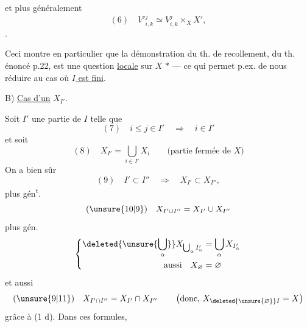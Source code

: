 et plus généralement
\[
(6)\quad V'{}^{j}_{i,k}\simeq V^{j}_{i,k}\times_X X',
\]
.

Ceci montre en particulier que la démonstration du th. de recollement, du th. énoncé p.22, est une question \uline{locale} sur $X$ \textcircled{$*$} --- ce qui permet p.ex. de nous réduire au cas où  \uline{$I$ est fini}.



B) \uline{Cas d'un} $X_{I'}$. 

Soit $I'$ une partie de $I$ telle que
\[
(7)\quad i\leq j\in I'\quad\Longrightarrow\quad i\in I'
\]
et soit
\[
(8)\quad X_{I'}=\bigcup_{i\in I'}X_i\qquad\text{(partie fermée de $X$)}
\]
On a bien sûr
\[
(9)\quad I'\subset I''\quad\Longrightarrow\quad X_{I'}\subset X_{I''},
\]
plus gén\textsuperscript{t}.
\[
(\unsure{10|9})\quad X_{I'\cup I''}=X_{I'}\cup X_{I''}
\]
plus gén.
\[
\left\{\begin{aligned}
\deleted{\unsure{\bigcup_\alpha}}X_{\bigcup_\alpha I'_\alpha}&=\bigcup_\alpha X_{I'_\alpha}\\
\text{aussi}\quad X_{\varnothing}&=\varnothing
\end{aligned}\right.
\]
et aussi
\[
(\unsure{9|11})\quad X_{I'\cap I''}=X_{I'}\cap X_{I''}\qquad
\left(\text{donc, }X_{\deleted{\unsure{\varnothing}}I}=X\right)
\]
grâce à (1 d). Dans ces formules,

